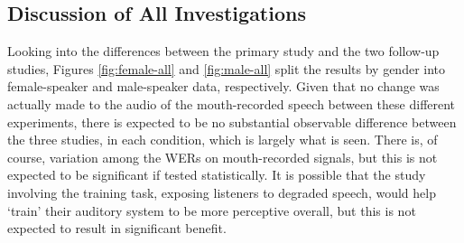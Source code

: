% 
% 



\subsection{Discussion of All Investigations}
\label{chap3:glob_discussion}

Looking into the differences between the primary study and the two follow-up studies, Figures \ref{fig:female-all} and \ref{fig:male-all} split the results by gender into female-speaker and male-speaker data, respectively.  Given that no change was actually made to the audio of the mouth-recorded speech between these different experiments, there is expected to be no substantial observable difference between the three studies, in each condition, which is largely what is seen.  There is, of course, variation among the WERs on mouth-recorded signals, but this is not expected to be significant if tested statistically.  It is possible that the study involving the training task, exposing listeners to degraded speech, would help `train' their auditory system to be more perceptive overall, but this is not expected to result in significant benefit.




